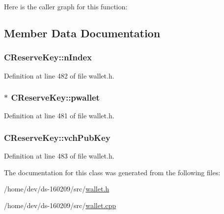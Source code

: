 Here is the caller graph for this function\+:




\subsection{Member Data Documentation}
\hypertarget{class_c_reserve_key_a16d05c9be039eb772f2daf412cca1991}{}
\subsubsection[{n\+Index}]{ C\+Reserve\+Key\+::n\+Index\hspace{0.3cm}{\ttfamily [protected]}}\label{class_c_reserve_key_a16d05c9be039eb772f2daf412cca1991}


Definition at line 482 of file wallet.\+h.

\hypertarget{class_c_reserve_key_aab8a4052c0b9a4337248ae53e77c6115}{}
\subsubsection[{pwallet}]{$\ast$ C\+Reserve\+Key\+::pwallet\hspace{0.3cm}{\ttfamily [protected]}}\label{class_c_reserve_key_aab8a4052c0b9a4337248ae53e77c6115}


Definition at line 481 of file wallet.\+h.

\hypertarget{class_c_reserve_key_a2b252444577b6aca8b497c2207ff17a4}{}
\subsubsection[{vch\+Pub\+Key}]{ C\+Reserve\+Key\+::vch\+Pub\+Key\hspace{0.3cm}{\ttfamily [protected]}}\label{class_c_reserve_key_a2b252444577b6aca8b497c2207ff17a4}


Definition at line 483 of file wallet.\+h.



The documentation for this class was generated from the following files\+:\begin{DoxyCompactItemize}
\item 
/home/dev/ds-\/160209/src/\hyperlink{wallet_8h}{wallet.\+h}\item 
/home/dev/ds-\/160209/src/\hyperlink{wallet_8cpp}{wallet.\+cpp}\end{DoxyCompactItemize}
